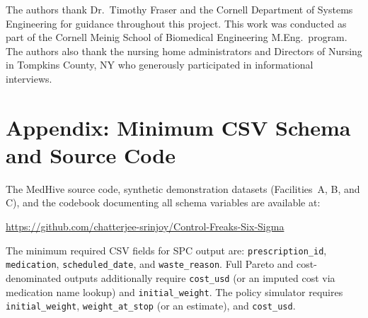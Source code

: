 \documentclass[letterpaper, 10pt, conference]{IEEEconf}
\begin{document}
The authors thank Dr.\ Timothy Fraser and the Cornell Department of Systems
Engineering for guidance throughout this project.
This work was conducted as part of the Cornell Meinig School of Biomedical
Engineering M.Eng.\ program.
The authors also thank the nursing home administrators and Directors of
Nursing in Tompkins County, NY who generously participated in informational
interviews.




\appendix
\section{Appendix: Minimum CSV Schema and Source Code}

The MedHive source code, synthetic demonstration datasets (Facilities~A, B,
and C), and the codebook documenting all schema variables are available at:
\begin{center}
\url{https://github.com/chatterjee-srinjoy/Control-Freaks-Six-Sigma}
\end{center}

The minimum required CSV fields for SPC output are:
\texttt{prescription\_id}, \texttt{medication}, \texttt{scheduled\_date},
and \texttt{waste\_reason}.
Full Pareto and cost-denominated outputs additionally require
\texttt{cost\_usd} (or an imputed cost via medication name lookup) and
\texttt{initial\_weight}.
The policy simulator requires \texttt{initial\_weight},
\texttt{weight\_at\_stop} (or an estimate), and \texttt{cost\_usd}.
\end{document}
